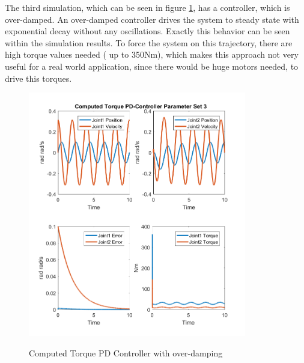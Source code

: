 The third simulation, which can be seen in figure \ref{fig:ct_pd3}, has a controller, which is over-damped. An over-damped controller drives the system to steady state with exponential decay without any oscillations. Exactly this behavior can be seen within the simulation results. To force the system on this trajectory, there are high torque values needed ( up to 350Nm), which makes this approach not very useful for a real world application, since there would be huge motors needed, to drive this torques.\\
\begin{figure}[]
	\centering
	\includegraphics[width=0.85\textwidth]{pics/ComputedTorquePD-ControllerParameterSet3.png}\\
	\caption{Computed Torque PD Controller with over-damping}
	\label{fig:ct_pd3}
\end{figure}

